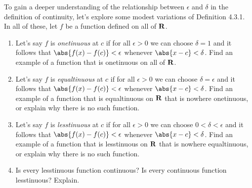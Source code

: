 \documentclass{lew98_solutions}
\begin{document}
\begin{exercise}
\label{ex:4.3.2}
    To gain a deeper understanding of the relationship between \( \epsilon \) and \( \delta \) in the definition of continuity, let's explore some modest variations of Definition 4.3.1. In all of these, let \( f \) be a function defined on all of \( \mathbf{R} \).
    \begin{enumerate}
        \item Let's say \( f \) is \textit{onetinuous} at \( c \) if for all \( \epsilon > 0 \) we can choose \( \delta = 1 \) and it follows that \( \abs{f(x) - f(c)} < \epsilon \) whenever \( \abs{x - c} < \delta \). Find an example of a function that is onetinuous on all of \( \mathbf{R} \).

        \item Let's say \( f \) is \textit{equaltinuous} at \( c \) if for all \( \epsilon > 0 \) we can choose \( \delta = \epsilon \) and it follows that \( \abs{f(x) - f(c)} < \epsilon \) whenever \( \abs{x - c} < \delta \). Find an example of a function that is equaltinuous on \( \mathbf{R} \) that is nowhere onetinuous, or explain why there is no such function.
        
        \item Let's say \( f \) is \textit{lesstinuous} at \( c \) if for all \( \epsilon > 0 \) we can choose \( 0 < \delta < \epsilon \) and it follows that \( \abs{f(x) - f(c)} < \epsilon \) whenever \( \abs{x - c} < \delta \). Find an example of a function that is lesstinuous on \( \mathbf{R} \) that is nowhere equaltinuous, or explain why there is no such function.

        \item Is every lesstinuous function continuous? Is every continuous function lesstinuous? Explain.
    \end{enumerate}
\end{exercise}
\end{document}
